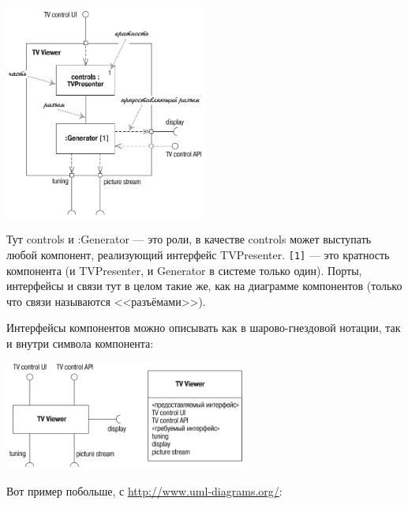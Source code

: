 \documentclass{../mcstext}
\begin{document}
\begin{center}
    \includegraphics[width=0.5\textwidth]{compositeStructureDiagram.png}
\end{center}

Тут controls и :Generator --- это роли, в качестве controls может выступать любой компонент, реализующий интерфейс TVPresenter. \verb|[1]| --- это кратность компонента (и TVPresenter, и Generator в системе только один). Порты, интерфейсы и связи тут в целом такие же, как на диаграмме компонентов (только что связи называются <<разъёмами>>).

Интерфейсы компонентов можно описывать как в шарово-гнездовой нотации, так и внутри символа компонента:

\begin{center}
    \includegraphics[width=0.6\textwidth]{compositeStructureElement.png}
\end{center}

Вот пример побольше, с \url{http://www.uml-diagrams.org/}:
\end{document}
